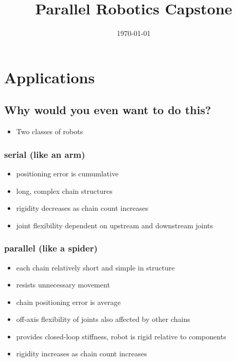 \documentclass[11pt]{article}
\date{\today}
\title{Parallel Robotics Capstone}
\begin{document}
\maketitle
\tableofcontents


\section{Applications}
\label{sec:orge97f799}

\subsection{Why would you even want to do this?}
\label{sec:org750a40a}

\begin{itemize}
\item Two classes of robots
\end{itemize}

\subsubsection{serial (like an arm)}
\label{sec:org6acf918}

\begin{itemize}
\item positioning error is cumumlative
\item long, complex chain structures
\item rigidity decreases as chain count increases
\item joint flexibility dependent on upstream and downstream joints
\end{itemize}

\subsubsection{parallel (like a spider)}
\label{sec:orge50dc6b}

\begin{itemize}
\item each chain relatively short and simple in structure
\item resists unnecessary movement
\item chain positioning error is average
\item off-axis flexibility of joints also affected by other chains
\item provides closed-loop stiffness, robot is rigid relative to components
\item rigidity increases as chain count increases
\end{itemize}
\end{document}
